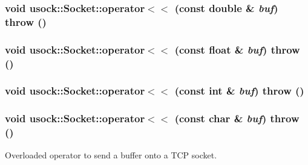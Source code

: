 \hypertarget{classusock_1_1Socket_b1da84bc5e90631c85b85e12852b5399}{
\subsubsection[{operator$<$$<$}]{\setlength{\rightskip}{0pt plus 5cm}void usock::Socket::operator$<$$<$ (const double \& {\em buf})  throw ()}}
\label{classusock_1_1Socket_b1da84bc5e90631c85b85e12852b5399}


\hypertarget{classusock_1_1Socket_da103da3dcc47ab072efd471deb4aa17}{
\subsubsection[{operator$<$$<$}]{\setlength{\rightskip}{0pt plus 5cm}void usock::Socket::operator$<$$<$ (const float \& {\em buf})  throw ()}}
\label{classusock_1_1Socket_da103da3dcc47ab072efd471deb4aa17}


\hypertarget{classusock_1_1Socket_41c1bddf8c1cc6bf2b7c06d9da38ebad}{
\subsubsection[{operator$<$$<$}]{\setlength{\rightskip}{0pt plus 5cm}void usock::Socket::operator$<$$<$ (const int \& {\em buf})  throw ()}}
\label{classusock_1_1Socket_41c1bddf8c1cc6bf2b7c06d9da38ebad}


\hypertarget{classusock_1_1Socket_07ccbad3e0d485df8111aec584c2f38e}{
\subsubsection[{operator$<$$<$}]{\setlength{\rightskip}{0pt plus 5cm}void usock::Socket::operator$<$$<$ (const char \& {\em buf})  throw ()}}
\label{classusock_1_1Socket_07ccbad3e0d485df8111aec584c2f38e}


Overloaded operator to send a buffer onto a TCP socket. 


